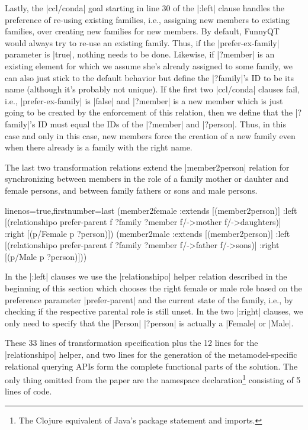 \documentclass[a4paper]{article}
\newcommand{\code}{\clojureinline}
\begin{document}
Lastly, the \code|ccl/conda| goal starting in line 30 of the \code|:left|
clause handles the preference of re-using existing families, i.e., assigning
new members to existing families, over creating new families for new members.
By default, FunnyQT would always try to re-use an existing family.  Thus, if
the \code|prefer-ex-family| parameter is \code|true|, nothing needs to be done.
Likewise, if \code|?member| is an existing element for which we assume she's
already assigned to some family, we can also just stick to the default behavior
but define the \code|?family|'s ID to be its name (although it's probably not
unique).  If the first two \code|ccl/conda| clauses fail, i.e.,
\code|prefer-ex-family| is \code|false| and \code|?member| is a new member
which is just going to be created by the enforcement of this relation, then we
define that the \code|?family|'s ID must equal the IDs of the \code|?member|
and \code|?person|.  Thus, in this case and only in this case, new members
force the creation of a new family even when there already is a family with the
right name.

The last two transformation relations extend the \code|member2person| relation
for synchronizing between members in the role of a family mother or dauhter and
female persons, and between family fathers or sons and male persons.

\begin{clojurecode*}{linenos=true,firstnumber=last}
  (member2female
   :extends [(member2person)]
   :left  [(relationshipo prefer-parent f ?family ?member f/->mother f/->daughters)]
   :right [(p/Female p ?person)])
  (member2male
   :extends [(member2person)]
   :left  [(relationshipo prefer-parent f ?family ?member f/->father f/->sons)]
   :right [(p/Male p ?person)]))
\end{clojurecode*}

In the \code|:left| clauses we use the \code|relationshipo| helper relation
described in the beginning of this section which chooses the right female or
male role based on the preference parameter \code|prefer-parent| and the
current state of the family, i.e., by checking if the respective parental role
is still unset.  In the two \code|:right| clauses, we only need to specify that
the \code|Person| \code|?person| is actually a \code|Female| or \code|Male|.

These 33 lines of transformation specification plus the 12 lines for the
\code|relationshipo| helper, and two lines for the generation of the
metamodel-specific relational querying APIs form the complete functional parts
of the solution.  The only thing omitted from the paper are the namespace
declaration\footnote{The Clojure equivalent of Java's package statement and
  imports.}  consisting of 5 lines of code.
\end{document}
